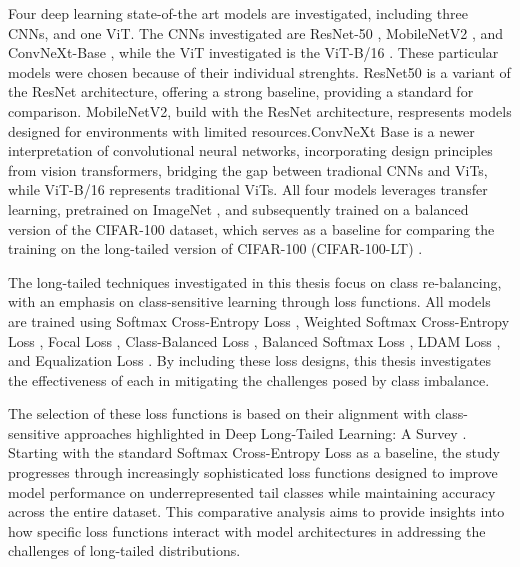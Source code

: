 Four deep learning state-of-the art models are investigated, including three CNNs, and one ViT. The CNNs investigated are ResNet-50 \cite{he2015deepresiduallearningimage}, MobileNetV2 \cite{sandler2018mobilenetv2}, and ConvNeXt-Base \cite{liu2022convnet2020s}, while the ViT investigated is the ViT-B/16 \cite{dosovitskiy2021imageworth16x16words}. These particular models were chosen because of their individual strenghts.  ResNet50 is a variant of the ResNet architecture, offering a strong baseline, providing a standard for comparison. MobileNetV2, build with the ResNet architecture, respresents models designed for environments with limited resources.ConvNeXt Base is a newer interpretation of convolutional neural networks, incorporating design principles from vision transformers, bridging the gap between tradional CNNs and ViTs, while ViT-B/16 represents traditional ViTs. All four models leverages transfer learning, pretrained on ImageNet \cite{ImageNet2009}, and subsequently trained on a balanced version of the CIFAR-100 \cite{krizhevsky2009learning} dataset, which serves as a baseline for comparing the training on the long-tailed version of CIFAR-100 (CIFAR-100-LT) \cite{cao2019learningimbalanceddatasetslabeldistributionaware}.  

The long-tailed techniques investigated in this thesis focus on class re-balancing, with an emphasis on class-sensitive learning through loss functions. All models are trained using Softmax Cross-Entropy Loss \cite{cs231n}, Weighted Softmax Cross-Entropy Loss \cite{zhang2023deep}, Focal Loss \cite{lin2018focallossdenseobject}, Class-Balanced Loss \cite{cui2019classbalancedlossbasedeffective}, Balanced Softmax Loss \cite{ren2020balancedmetasoftmaxlongtailedvisual}, LDAM Loss \cite{cao2019learningimbalanceddatasetslabeldistributionaware}, and Equalization Loss \cite{tan2020equalizationlosslongtailedobject}. By including these loss designs, this thesis investigates the effectiveness of each in mitigating the challenges posed by class imbalance.

The selection of these loss functions is based on their alignment with class-sensitive approaches highlighted in Deep Long-Tailed Learning: A Survey \cite{zhang2023deep}. Starting with the standard Softmax Cross-Entropy Loss as a baseline, the study progresses through increasingly sophisticated loss functions designed to improve model performance on underrepresented tail classes while maintaining accuracy across the entire dataset. This comparative analysis aims to provide insights into how specific loss functions interact with model architectures in addressing the challenges of long-tailed distributions. 

